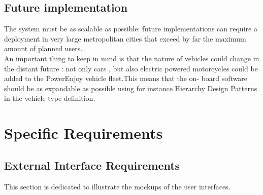 \documentclass[12pt]{article}
\begin{document}
	\subsection{Future implementation}
		The system must be as scalable as possible: future implementations can require a 
		deployment in very large metropolitan cities that exceed by far the maximum amount of 
		planned users.\\ An important thing to keep in mind is that the nature of vehicles 
		could change in the distant future : not only cars , but also electric powered 
		motorcycles could be added to the PowerEnjoy vehicle fleet.This means that the on-
		board software should be as expandable as possible using for instance Hierarchy Design 
		Patterns in the vehicle type definition.
	 

	\newpage

 	\section{\Large Specific Requirements}
	
 		\FloatBarrier
		\subsection{External Interface Requirements}
 			This section is dedicated to illustrate the mockups of the user interfaces.

\end{document}
